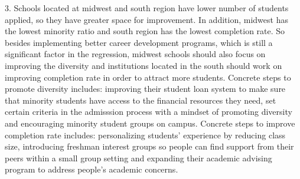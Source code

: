 \documentclass{article}
\begin{document}
3. Schools located at midwest and south region have lower number of students applied, so they have greater space for improvement. In addition, midwest has the lowest minority ratio and south region has the lowest completion rate. So besides implementing better career development programs, which is still a significant factor in the regression, midwest schools should also focus on improving the diversity and institutions located in the south should work on improving completion rate in order to attract more students. Concrete steps to promote diversity includes: improving their student loan system to make sure that minority students have access to the financial resources they need, set certain criteria in the admisssion process with a mindset of promoting diversity and encouraging minority student groups on campus. Concrete steps to improve completion rate includes: personalizing students' experience by reducing class size, introducing freshman interest groups so people can find support from their peers within a small group setting and expanding their academic advising program to address people's academic concerns.  
\end{document}
